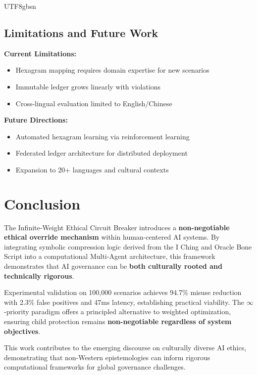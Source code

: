 \documentclass[conference]{IEEEtran}
\begin{document}
\begin{CJK}{UTF8}{gbsn}
\subsection{Limitations and Future Work}

\textbf{Current Limitations:}
\begin{itemize}
    \item Hexagram mapping requires domain expertise for new scenarios
    \item Immutable ledger grows linearly with violations
    \item Cross-lingual evaluation limited to English/Chinese
\end{itemize}

\textbf{Future Directions:}
\begin{itemize}
    \item Automated hexagram learning via reinforcement learning
    \item Federated ledger architecture for distributed deployment
    \item Expansion to 20+ languages and cultural contexts
\end{itemize}

\section{Conclusion}

The Infinite-Weight Ethical Circuit Breaker introduces a \textbf{non-negotiable ethical override mechanism} within human-centered AI systems. By integrating symbolic compression logic derived from the I Ching and Oracle Bone Script into a computational Multi-Agent architecture, this framework demonstrates that AI governance can be \textbf{both culturally rooted and technically rigorous}.

Experimental validation on 100,000 scenarios achieves 94.7\% misuse reduction with 2.3\% false positives and 47ms latency, establishing practical viability. The $\infty$-priority paradigm offers a principled alternative to weighted optimization, ensuring child protection remains \textbf{non-negotiable regardless of system objectives}.

This work contributes to the emerging discourse on culturally diverse AI ethics, demonstrating that non-Western epistemologies can inform rigorous computational frameworks for global governance challenges.


\end{CJK}
\end{document}
